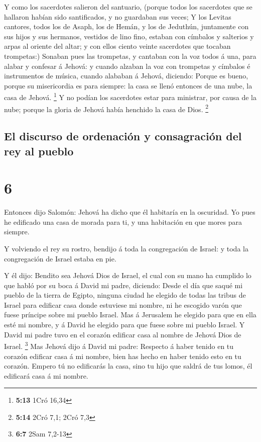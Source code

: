  Y como los sacerdotes salieron del santuario, (porque
todos los sacerdotes que se hallaron habían sido santificados, y no
guardaban sus veces;  Y los Levitas cantores, todos los de
Asaph, los de Hemán, y los de Jeduthún, juntamente con sus hijos y sus
hermanos, vestidos de lino fino, estaban con címbalos y salterios y
arpas al oriente del altar; y con ellos ciento veinte sacerdotes que
tocaban trompetas:)  Sonaban pues las trompetas, y cantaban
con la voz todos á una, para alabar y confesar á Jehová: y cuando
alzaban la voz con trompetas y címbalos é instrumentos de música, cuando
alababan á Jehová, diciendo: Porque es bueno, porque su misericordia es
para siempre: la casa se llenó entonces de una nube, la casa de Jehová.
\footnote{\textbf{5:13} 1Cró 16,34}  Y no podían los
sacerdotes estar para ministrar, por causa de la nube; porque la gloria
de Jehová había henchido la casa de Dios. \footnote{\textbf{5:14} 2Cró
  7,1; 2Cró 7,3}

\hypertarget{el-discurso-de-ordenaciuxf3n-y-consagraciuxf3n-del-rey-al-pueblo}{%
\subsection{El discurso de ordenación y consagración del rey al
pueblo}\label{el-discurso-de-ordenaciuxf3n-y-consagraciuxf3n-del-rey-al-pueblo}}

\hypertarget{section-5}{%
\section{6}\label{section-5}}

 Entonces dijo Salomón: Jehová ha dicho que él habitaría en
la oscuridad.  Yo pues he edificado una casa de morada para
ti, y una habitación en que mores para siempre.

 Y volviendo el rey su rostro, bendijo á toda la
congregación de Israel: y toda la congregación de Israel estaba en pie.

 Y él dijo: Bendito sea Jehová Dios de Israel, el cual con
su mano ha cumplido lo que habló por su boca á David mi padre, diciendo:
 Desde el día que saqué mi pueblo de la tierra de Egipto,
ninguna ciudad he elegido de todas las tribus de Israel para edificar
casa donde estuviese mi nombre, ni he escogido varón que fuese príncipe
sobre mi pueblo Israel.  Mas á Jerusalem he elegido para que
en ella esté mi nombre, y á David he elegido para que fuese sobre mi
pueblo Israel.  Y David mi padre tuvo en el corazón edificar
casa al nombre de Jehová Dios de Israel. \footnote{\textbf{6:7} 2Sam
  7,2-13}  Mas Jehová dijo á David mi padre: Respecto á
haber tenido en tu corazón edificar casa á mi nombre, bien has hecho en
haber tenido esto en tu corazón.  Empero tú no edificarás la
casa, sino tu hijo que saldrá de tus lomos, él edificará casa á mi
nombre.

